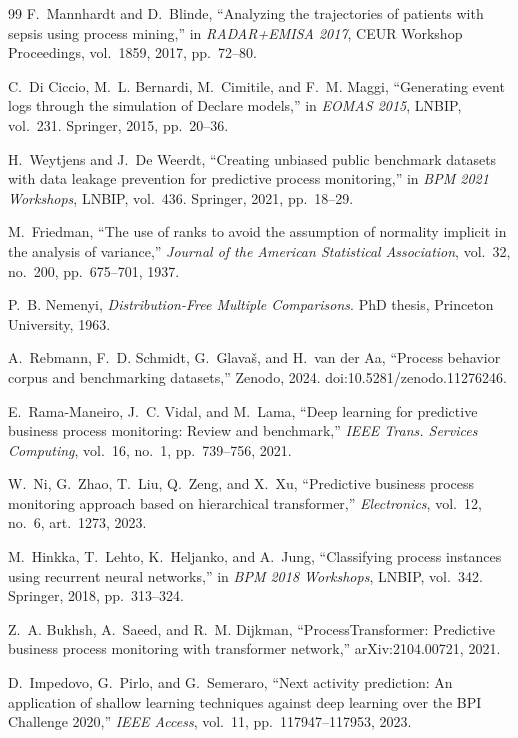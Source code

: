 \documentclass[a4paper,12pt,oneside]{report}
\begin{document}
\begin{thebibliography}{99}
 F.~Mannhardt and D.~Blinde, ``Analyzing the trajectories of patients with sepsis using process mining,'' in \textit{RADAR+EMISA 2017}, CEUR Workshop Proceedings, vol.~1859, 2017, pp.~72--80.

 C.~Di Ciccio, M.~L. Bernardi, M.~Cimitile, and F.~M. Maggi, ``Generating event logs through the simulation of Declare models,'' in \textit{EOMAS 2015}, LNBIP, vol.~231. Springer, 2015, pp.~20--36.

 H.~Weytjens and J.~De Weerdt, ``Creating unbiased public benchmark datasets with data leakage prevention for predictive process monitoring,'' in \textit{BPM 2021 Workshops}, LNBIP, vol.~436. Springer, 2021, pp.~18--29.

 M.~Friedman, ``The use of ranks to avoid the assumption of normality implicit in the analysis of variance,'' \textit{Journal of the American Statistical Association}, vol.~32, no.~200, pp.~675--701, 1937.

 P.~B. Nemenyi, \textit{Distribution-Free Multiple Comparisons}. PhD thesis, Princeton University, 1963.

 A.~Rebmann, F.~D. Schmidt, G.~Glavaš, and H.~van der Aa, ``Process behavior corpus and benchmarking datasets,'' Zenodo, 2024. doi:10.5281/zenodo.11276246.

 E.~Rama-Maneiro, J.~C. Vidal, and M.~Lama, ``Deep learning for predictive business process monitoring: Review and benchmark,'' \textit{IEEE Trans. Services Computing}, vol.~16, no.~1, pp.~739--756, 2021.

 W.~Ni, G.~Zhao, T.~Liu, Q.~Zeng, and X.~Xu, ``Predictive business process monitoring approach based on hierarchical transformer,'' \textit{Electronics}, vol.~12, no.~6, art.~1273, 2023.

 M.~Hinkka, T.~Lehto, K.~Heljanko, and A.~Jung, ``Classifying process instances using recurrent neural networks,'' in \textit{BPM 2018 Workshops}, LNBIP, vol.~342. Springer, 2018, pp.~313--324.

 Z.~A. Bukhsh, A.~Saeed, and R.~M. Dijkman, ``ProcessTransformer: Predictive business process monitoring with transformer network,'' arXiv:2104.00721, 2021.

 D.~Impedovo, G.~Pirlo, and G.~Semeraro, ``Next activity prediction: An application of shallow learning techniques against deep learning over the BPI Challenge 2020,'' \textit{IEEE Access}, vol.~11, pp.~117947--117953, 2023.


\end{thebibliography}
\end{document}
